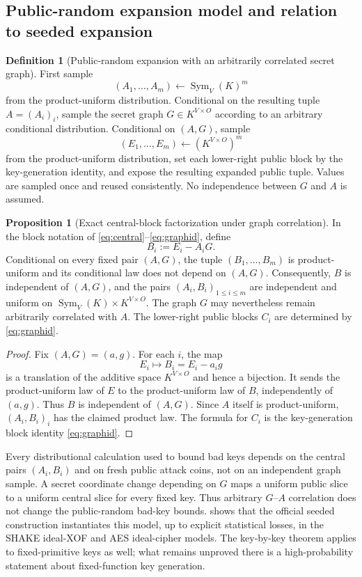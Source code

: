 \documentclass[11pt,a4paper]{article}
\theoremstyle{definition}
\newtheorem{proposition}[theorem]{Proposition}
\newtheorem{definition}[theorem]{Definition}
\theoremstyle{remark}
\newcommand{\Sym}{\operatorname{Sym}}
\begin{document}
\subsection{Public-random expansion model and relation to seeded expansion}

\begin{definition}[Public-random expansion with an arbitrarily correlated secret graph]\label{def:ideal}
First sample
\[
(A_1,\ldots,A_m)\leftarrow\Sym_V(K)^m
\]
from the product-uniform distribution.  Conditional on the resulting tuple $A=(A_i)_i$, sample the secret graph $G\in K^{V\times O}$ according to an arbitrary conditional distribution.  Conditional on $(A,G)$, sample
\[
(E_1,\ldots,E_m)\leftarrow(K^{V\times O})^m
\]
from the product-uniform distribution, set each lower-right public block by the key-generation identity, and expose the resulting expanded public tuple.  Values are sampled once and reused consistently.  No independence between $G$ and $A$ is assumed.
\end{definition}

\begin{proposition}[Exact central-block factorization under graph correlation]\label{prop:ideal-factorization}
In the block notation of \eqref{eq:central}--\eqref{eq:graphid}, define
\[
B_i:=E_i-A_iG.
\]
Conditional on every fixed pair $(A,G)$, the tuple $(B_1,\ldots,B_m)$ is product-uniform and its conditional law does not depend on $(A,G)$.  Consequently, $B$ is independent of $(A,G)$, and the pairs $(A_i,B_i)_{1\le i\le m}$ are independent and uniform on $\Sym_V(K)\times K^{V\times O}$.  The graph $G$ may nevertheless remain arbitrarily correlated with $A$.  The lower-right public blocks $C_i$ are determined by \eqref{eq:graphid}.
\end{proposition}

\begin{proof}
Fix $(A,G)=(a,g)$.  For each $i$, the map
\[
E_i\longmapsto B_i=E_i-a_ig
\]
is a translation of the additive space $K^{V\times O}$ and hence a bijection.  It sends the product-uniform law of $E$ to the product-uniform law of $B$, independently of $(a,g)$.  Thus $B$ is independent of $(A,G)$.  Since $A$ itself is product-uniform, $(A_i,B_i)_i$ has the claimed product law.  The formula for $C_i$ is the key-generation block identity \eqref{eq:graphid}.
\end{proof}

Every distributional calculation used to bound bad keys depends on the central pairs $(A_i,B_i)$ and on fresh public attack coins, not on an independent graph sample.  A secret coordinate change depending on $G$ maps a uniform public slice to a uniform central slice for every fixed key.  Thus arbitrary $G$--$A$ correlation does not change the public-random bad-key bounds.   shows that the official seeded construction instantiates this model, up to explicit statistical losses, in the SHAKE ideal-XOF and AES ideal-cipher models.  The key-by-key theorem applies to fixed-primitive keys as well; what remains unproved there is a high-probability statement about fixed-function key generation.
\end{document}
